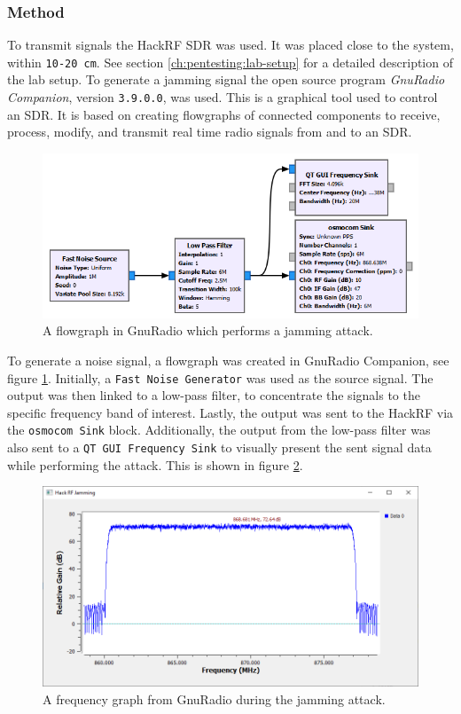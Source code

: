 \subsubsection{Method}
To transmit signals the HackRF SDR was used. It was placed close to the system, within \texttt{10-20 cm}. See section \ref{ch:pentesting:lab-setup} for a detailed description of the lab setup. To generate a jamming signal the open source program \textit{GnuRadio Companion}, version \texttt{3.9.0.0}, was used. This is a graphical tool used to control an SDR. It is based on creating flowgraphs of connected components to receive, process, modify, and transmit real time radio signals from and to an SDR.
\begin{figure}[!ht]
    \centering
    \includegraphics[width=\textwidth]{images/6-pentesting/jamming-flowgraph.png}
    \caption{A flowgraph in GnuRadio which performs a jamming attack.}
    \label{fig:gnuradio-jamming-flowgraph}
\end{figure}
To generate a noise signal, a flowgraph was created in GnuRadio Companion, see figure \ref{fig:gnuradio-jamming-flowgraph}. Initially, a \texttt{Fast Noise Generator} was used as the source signal. The output was then linked to a low-pass filter, to concentrate the signals to the specific frequency band of interest. Lastly, the output was sent to the HackRF via the \texttt{osmocom Sink} block. Additionally, the output from the low-pass filter was also sent to a \texttt{QT GUI Frequency Sink} to visually present the sent signal data while performing the attack. This is shown in figure \ref{fig:gnuradio-frequency-graph}.
\begin{figure}[!ht]
    \centering
    \includegraphics[width=\textwidth]{images/6-pentesting/jamming-output-graph.png}
    \caption{A frequency graph from GnuRadio during the jamming attack.}
    \label{fig:gnuradio-frequency-graph}
\end{figure}

